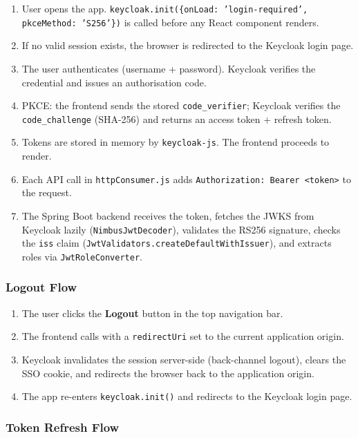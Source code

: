 \documentclass[12pt,a4paper]{report}
\begin{document}
\begin{enumerate}
  \item User opens the app. \texttt{keycloak.init(\{onLoad: 'login-required', pkceMethod: 'S256'\})} is
        called before any React component renders.
  \item If no valid session exists, the browser is redirected to the Keycloak login page.
  \item The user authenticates (username + password). Keycloak verifies the credential and
        issues an authorisation code.
  \item PKCE: the frontend sends the stored \texttt{code\_verifier}; Keycloak verifies the
        \texttt{code\_challenge} (SHA-256) and returns an access token + refresh token.
  \item Tokens are stored in memory by \texttt{keycloak-js}. The frontend proceeds to render.
  \item Each API call in \texttt{httpConsumer.js} adds \texttt{Authorization: Bearer <token>} to the request.
  \item The Spring Boot backend receives the token, fetches the JWKS from Keycloak lazily
        (\texttt{NimbusJwtDecoder}), validates the RS256 signature, checks the \texttt{iss} claim
        (\texttt{JwtValidators.createDefaultWithIssuer}), and extracts roles via \texttt{JwtRoleConverter}.
\end{enumerate}

\subsubsection{Logout Flow}

\begin{enumerate}
  \item The user clicks the \textbf{Logout} button in the top navigation bar.
  \item The frontend calls  with a \texttt{redirectUri} set to the current application origin.
  \item Keycloak invalidates the session server-side (back-channel logout), clears the SSO
        cookie, and redirects the browser back to the application origin.
  \item The app re-enters \texttt{keycloak.init()} and redirects to the Keycloak login page.
\end{enumerate}

\subsubsection{Token Refresh Flow}
\end{document}
